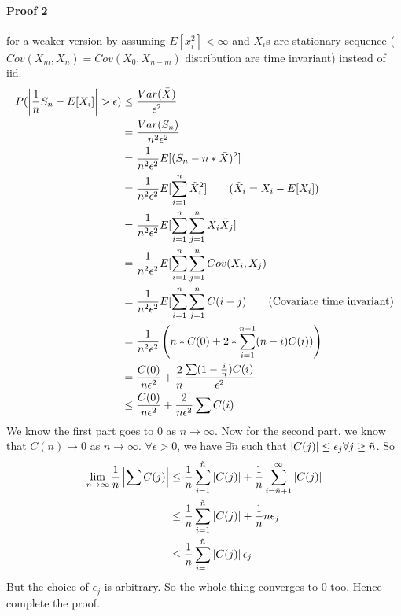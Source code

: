 \paragraph{Proof 2} for a weaker version by assuming $E[x_i^2] < \infty$ and $X_i$s are stationary sequence ($Cov(X_m, X_n) = Cov(X_0, X_{n-m})$ distribution are time invariant) instead of iid. 
\begin{align*}
    P(\abs{\frac{1}{n}S_n - E[X_i]} > \epsilon) 
    & \leq \frac{Var(\bar{X})}{\epsilon^2}\\
    & = \frac{Var(S_n)}{n^2 \epsilon^2} \\
    & = \frac{1}{n^2 \epsilon^2} E[(S_n - n* \bar{X}) ^2] \\
    & = \frac{1}{n^2 \epsilon^2} E[\sum_{i=1}^n \tilde{X}_i^2] \tag{$\tilde{X}_i = X_i - E[X_i]$} \\
    & = \frac{1}{n^2 \epsilon^2} E[\sum_{i=1}^n \sum_{j=1}^n \tilde{X}_i \tilde{X}_j] \\
    & = \frac{1}{n^2 \epsilon^2} E[\sum_{i=1}^n \sum_{j=1}^n Cov(X_i, X_j) \\
    & =  \frac{1}{n^2 \epsilon^2} E[\sum_{i=1}^n \sum_{j=1}^n C(i-j) \tag{Covariate time invariant} \\
    & = \frac{1}{n^2 \epsilon^2} \left(n * C(0) + 2 * \sum_{i=1}^{n-1} (n-i) C(i)) \right) \\
    & = \frac{C(0)}{n \epsilon^2} + \frac{2}{n} \frac{\sum (1-\frac{i}{n}) C(i)}{\epsilon^2}\\
    & \leq \frac{C(0)}{n \epsilon^2} + \frac{2}{n \epsilon^2} \sum C(i)\\
\end{align*}
We know the first part goes to 0 as $n \to \infty$. Now for the second part, we know that $C(n) \to 0$ as $n \to \infty$. $\forall \epsilon > 0$, we have $\exists \tilde{n}$ such that $\left| C(j) \right| \leq \epsilon_j \forall j \geq \tilde{n}$. So
    \begin{align*}
        \lim_{n \to \infty } \frac{1}{n} \left| \sum C(j) \right| 
        & \leq \frac{1}{n }\sum_{i=1}^{\tilde{n}} \left| C(j) \right|  + \frac{1}{n }\sum_{i=\tilde{n}+1}^\infty \left| C(j) \right|\\
        & \leq \frac{1}{n }\sum_{i=1}^{\tilde{n}} \left| C(j) \right|  + \frac{1}{n} n \epsilon_j\\
        &  \leq \frac{1}{n }\sum_{i=1}^{\tilde{n}} \left| C(j) \right|\epsilon_j\\
    \end{align*}
But the choice of $\epsilon_j$ is arbitrary. So the whole thing converges to 0 too. Hence complete the proof. 

